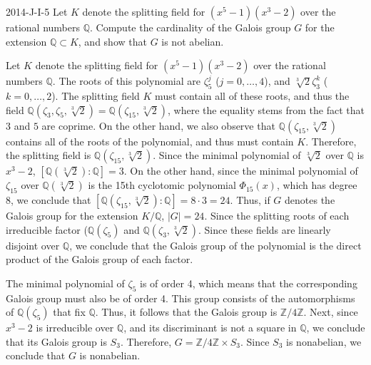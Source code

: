 \documentclass{article}
\begin{document}
	
	\begin{prb}{2014-J-I-5}
		Let $K$ denote the splitting field for $(x^{5} - 1)(x^{3} - 2)$ over the rational numbers $\mathbb{Q}$. Compute the cardinality of the Galois group $G$ for the extension $\mathbb{Q} \subset K$, and show that $G$ is not abelian. 
	\end{prb}
	Let $K$ denote the splitting field for $(x^{5} - 1)(x^{3} - 2)$ over the rational numbers $\mathbb{Q}$. The roots of this polynomial are $\zeta_{5}^{j}$ ($j = 0, \ldots, 4$), and $\sqrt[3]{2}\zeta_{3}^{k}$ ($k = 0, \ldots, 2$). The splitting field $K$ must contain all of these roots, and thus the field $\mathbb{Q}(\zeta_{3}, \zeta_{5}, \sqrt[3]{2}) = \mathbb{Q}(\zeta_{15}, \sqrt[3]{2})$, where the equality stems from the fact that $3$ and $5$ are coprime. On the other hand, we also observe that $\mathbb{Q}(\zeta_{15}, \sqrt[3]{2})$ contains all of the roots of the polynomial, and thus must contain $K$. Therefore, the splitting field is $\mathbb{Q}(\zeta_{15}, \sqrt[3]{2})$. Since the minimal polynomial of $\sqrt[3]{2}$ over $\mathbb{Q}$ is $x^{3} - 2$, $[\mathbb{Q}(\sqrt[3]{2}): \mathbb{Q}] = 3$. On the other hand, since the minimal polynomial of $\zeta_{15}$ over $\mathbb{Q}(\sqrt[3]{2})$ is the 15th cyclotomic polynomial $\Phi_{15}(x)$, which has degree 8, we conclude that $[\mathbb{Q}(\zeta_{15},\sqrt[3]{2}):\mathbb{Q}] = 8 \cdot 3 = 24$. Thus, if $G$ denotes the Galois group for the extension $K/\mathbb{Q}$, $|G| = 24$. Since the splitting roots of each irreducible factor ($\mathbb{Q}(\zeta_{5})$ and $\mathbb{Q}(\zeta_{3}, \sqrt[3]{2})$. Since these fields are linearly disjoint over $\mathbb{Q}$, we conclude that the Galois group of the polynomial is the direct product of the Galois group of each factor. 
	
	The minimal polynomial of $\zeta_{5}$ is of order 4, which means that the corresponding Galois group must also be of order 4. This group consists of the automorphisms of $\mathbb{Q}(\zeta_{5})$ that fix $\mathbb{Q}$. Thus, it follows that the Galois group is $\mathbb{Z}/4\mathbb{Z}$. Next, since $x^{3} - 2$ is irreducible over $\mathbb{Q}$, and its discriminant is not a square in $\mathbb{Q}$, we conclude that its Galois group is $S_{3}$. Therefore, $G = \mathbb{Z}/4\mathbb{Z} \times S_{3}$. Since $S_{3}$ is nonabelian, we conclude that $G$ is nonabelian. 
	
\end{document}
